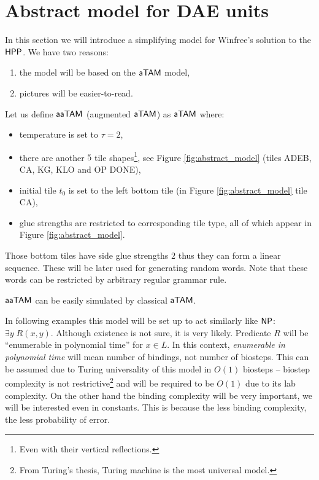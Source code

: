 \section{Abstract model for DAE units}

In this section we will introduce a simplifying model for Winfree's solution to the $\sf HPP$. We have two reasons:
\begin{enumerate}   %
	\item the model will be based on the $\mathsf{aTAM}$ model,
	\item pictures will be easier-to-read.
\end{enumerate}

\begin{defn}
	Let us define $\mathsf{aaTAM}$ (augmented $\mathsf{aTAM}$) as $\mathsf{aTAM}$ where:
	\begin{itemize}
		\item temperature is set to $\tau = 2$,
		\item there are another $5$ tile shapes\footnote{Even with their vertical reflections.}, see Figure \ref{fig:abstract_model} (tiles {\sf ADEB}, {\sf CA}, {\sf KG}, {\sf KLO} and {\sf OP DONE}),
		\item initial tile $t_0$ is set to the left bottom tile (in Figure \ref{fig:abstract_model} tile {\sf CA}),
		\item glue strengths are restricted to corresponding tile type, all of which appear in Figure \ref{fig:abstract_model}.
	\end{itemize}
\end{defn}

\begin{note}
	Those bottom tiles have side glue strengths $2$ thus they can form a linear sequence. These will be later used for generating random words. Note that these words can be restricted by arbitrary regular grammar rule.
\end{note}

\begin{note}
	$\mathsf{aaTAM}$ can be easily simulated by classical $\mathsf{aTAM}$.
\end{note}


In following examples this model will be set up to act similarly like $\mathsf{NP}$: $\exists y \; R(x,y)$. Although existence is not sure, it is very likely. Predicate $R$ will be ``enumerable in polynomial time'' for $x \in L$. In this context, {\em enumerable in polynomial time} will mean number of bindings, not number of biosteps. This can be assumed due to Turing universality of this model in $O(1)$ biosteps -- biostep complexity is not restrictive\footnote{From Turing's thesis, Turing machine is the most universal model.} and will be required to be $O(1)$ due to its lab complexity. On the other hand the binding complexity will be very important, we will be interested even in constants. This is because the less binding complexity, the less probability of error.

